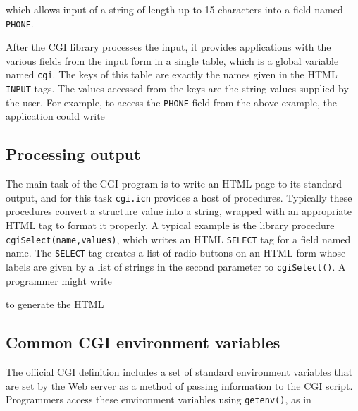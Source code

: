 {

\noindent
which allows input of a string of length up to 15 characters into a
field named \texttt{PHONE}.

After the CGI library processes the input, it provides applications with
the various fields from the input form in a single table, which is a
global variable named \texttt{cgi}. The keys of this table are exactly
the names given in the HTML \texttt{INPUT} tags. The values accessed
from the keys are the string values supplied by the user. For example,
to access the \texttt{PHONE} field from the above example, the
application could write 


\subsection{Processing output}

The main task of the CGI program is to write an HTML page to its
standard output, and for this task \texttt{cgi.icn} provides a host of
procedures. Typically these procedures convert a structure value into a
string, wrapped with an appropriate HTML tag to format it properly. A
typical example is the library procedure
\texttt{cgiSelect(name,values)}, which writes an HTML \texttt{SELECT}
tag for a field named name. The \texttt{SELECT} tag creates a list of
radio buttons on an HTML form whose labels are given by a list of
strings in the second parameter to \texttt{cgiSelect()}. A programmer
might write


\noindent to generate the HTML


\subsection{Common CGI environment variables}

The official CGI definition includes a set
of standard environment
variables that are set by the Web server as a method of passing
information to the CGI script. Programmers access these environment
variables using \texttt{getenv()}, as in

}
